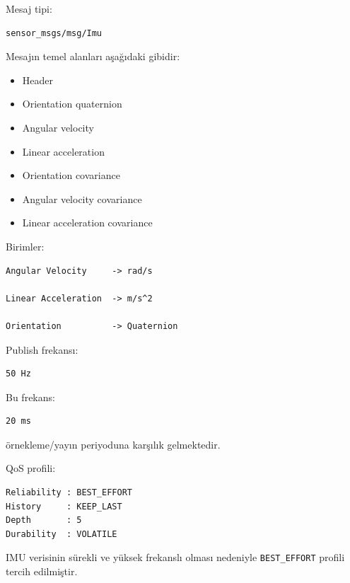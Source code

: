 \documentclass[12pt,a4paper]{article}
\begin{document}
Mesaj tipi:

\begin{verbatim}
sensor_msgs/msg/Imu
\end{verbatim}

Mesajın temel alanları aşağıdaki gibidir:

\begin{itemize}

    \item Header

    \item Orientation quaternion

    \item Angular velocity

    \item Linear acceleration

    \item Orientation covariance

    \item Angular velocity covariance

    \item Linear acceleration covariance

\end{itemize}

Birimler:

\begin{verbatim}
Angular Velocity     -> rad/s

Linear Acceleration  -> m/s^2

Orientation          -> Quaternion
\end{verbatim}

Publish frekansı:

\begin{verbatim}
50 Hz
\end{verbatim}

Bu frekans:

\begin{verbatim}
20 ms
\end{verbatim}

örnekleme/yayın periyoduna karşılık gelmektedir.

QoS profili:

\begin{verbatim}
Reliability : BEST_EFFORT
History     : KEEP_LAST
Depth       : 5
Durability  : VOLATILE
\end{verbatim}

IMU verisinin sürekli ve yüksek frekanslı olması nedeniyle
\texttt{BEST\_EFFORT} profili tercih edilmiştir.
\end{document}

